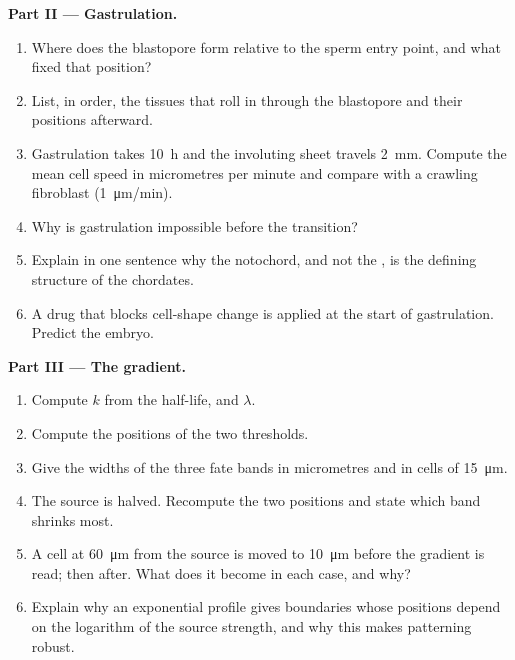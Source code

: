 \begin{problem}
\medskip
\noindent\textbf{Part II --- Gastrulation.}
\begin{enumerate}[resume]
  \item Where does the blastopore form relative to the sperm entry
        point, and what fixed that position?
  \item List, in order, the tissues that roll in through the
        blastopore and their positions afterward.
  \item Gastrulation takes \qty{10}{h} and the involuting sheet
        travels \qty{2}{mm}. Compute the mean cell speed in
        micrometres per minute and compare with a crawling
        fibroblast (\qty{1}{\micro m/min}).
  \item Why is gastrulation impossible before the 
        transition?
  \item Explain in one sentence why the notochord, and not the
        , is the defining structure of the chordates.
  \item A drug that blocks cell-shape change is applied at the start
        of gastrulation. Predict the embryo.
\end{enumerate}

\medskip
\noindent\textbf{Part III --- The gradient.}
\begin{enumerate}[resume]
  \item Compute $k$ from the half-life, and $\lambda$.
  \item Compute the positions of the two thresholds.
  \item Give the widths of the three fate bands in micrometres and in
        cells of \qty{15}{\micro m}.
  \item The source is halved. Recompute the two positions and state
        which band shrinks most.
  \item A cell at \qty{60}{\micro m} from the source is moved to
        \qty{10}{\micro m} before the gradient is read; then after.
        What does it become in each case, and why?
  \item Explain why an exponential profile gives boundaries whose
        positions depend on the logarithm of the source strength,
        and why this makes patterning robust.
\end{enumerate}


\end{problem}
